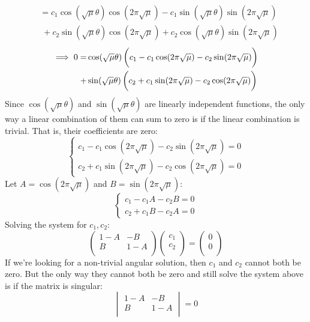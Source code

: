 \documentclass[12pt]{article}
\begin{document}
\begin{enumerate}[(a)]
{\begin{align*}
&= c_1 \cos(\sqrt{\mu} \theta) \cos( 2\pi \sqrt{\mu} ) - c_1 \sin(\sqrt{\mu} \theta) \sin( 2\pi \sqrt{\mu}) \\
& \; + c_2 \sin(\sqrt{\mu} \theta) \cos(  2\pi \sqrt{\mu}) + c_2 \cos(\sqrt{\mu} \theta) \sin( 2\pi \sqrt{\mu})
\end{align*}
\begin{align*}
\implies 0 =& \cos(\sqrt{\mu} \theta) \left( \vphantom{\frac{1}{1}} c_1 - c_1 \cos( 2\pi \sqrt{\mu} ) - c_2 \sin( 2\pi \sqrt{\mu}) \right) \\
+& \sin(\sqrt{\mu} \theta) \left( \vphantom{\frac{1}{1}} c_2 + c_1 \sin( 2\pi \sqrt{\mu}) - c_2 \cos( 2\pi \sqrt{\mu} ) \right)
\end{align*}
Since $\cos(\sqrt{\mu} \theta)$ and $\sin(\sqrt{\mu} \theta)$ are linearly independent functions, the only way a linear combination of them can sum to zero is if the linear combination is trivial. That is, their coefficients are zero:
$$\begin{cases}
c_1 - c_1 \cos( 2\pi \sqrt{\mu} ) - c_2 \sin( 2\pi \sqrt{\mu}) = 0 \\
c_2 + c_1 \sin( 2\pi \sqrt{\mu} ) - c_2 \cos( 2\pi \sqrt{\mu}) = 0
\end{cases}$$
Let $A = \cos(2\pi \sqrt{\mu} )$ and $B = \sin( 2\pi \sqrt{\mu})$:
$$\begin{cases}
c_1 - c_1 A - c_2 B = 0 \\
c_2 + c_1 B - c_2 A = 0
\end{cases}$$
Solving the system for $c_1, c_2$:
$$
\begin{pmatrix}
1-A & -B \\
B & 1-A \\
\end{pmatrix}
\begin{pmatrix}
c_1 \\
c_2 \\
\end{pmatrix} = 
\begin{pmatrix}
0 \\
0 \\
\end{pmatrix}$$
If we're looking for a non-trivial angular solution, then $c_1$ and $c_2$ cannot both be zero. But the only way they cannot both be zero and still solve the system above is if the matrix is singular:
$$
\begin{vmatrix}
1-A & -B \\
B & 1-A \\
\end{vmatrix} = 0
$$}
\end{enumerate}
\end{document}
